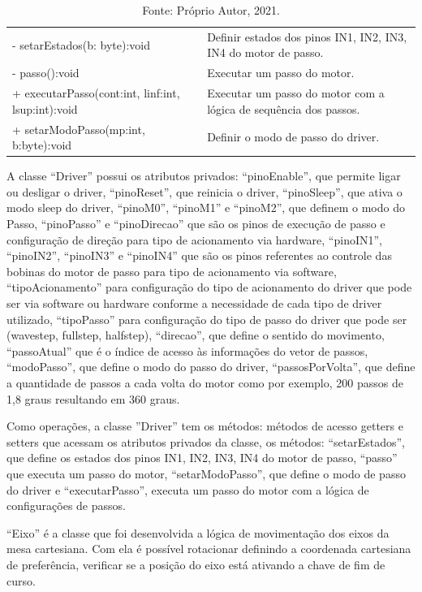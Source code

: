 \begin{table}[!htb]
\begin{tabular}{p{8cm}p{6cm}}
        - setarEstados(b: byte):void & Definir estados dos pinos IN1, IN2, IN3, IN4 do motor de passo.\\
        - passo():void & Executar um passo do motor.\\
        + executarPasso(cont:int, linf:int, lsup:int):void & Executar um passo do motor com a lógica de sequência dos passos.\\
        + setarModoPasso(mp:int, b:byte):void & Definir o modo de passo do driver.\\
        \hline       
    \end{tabular}
    \caption*{Fonte: Próprio Autor, 2021.}
    \label{tab:classedriver}
\end{table}

A classe “Driver” possui os atributos privados: “pinoEnable”, que permite ligar ou desligar o driver, 
“pinoReset”, que reinicia o driver, “pinoSleep”, que ativa o modo sleep do driver, “pinoM0”, “pinoM1” 
e “pinoM2”, que definem o modo do Passo, “pinoPasso” e “pinoDirecao” que são os pinos de execução de 
passo e configuração de direção para tipo de acionamento via hardware, “pinoIN1”, “pinoIN2”, “pinoIN3” 
e “pinoIN4” que são os pinos referentes ao controle das bobinas do motor de passo para tipo de acionamento 
via software, “tipoAcionamento” para configuração do tipo de acionamento do driver que pode ser via software 
ou hardware conforme a necessidade de cada tipo de driver utilizado, “tipoPasso” para configuração do tipo 
de passo do driver que pode ser (wavestep, fullstep, halfstep), “direcao”, que define o sentido do movimento, 
“passoAtual” que é o índice de acesso às informações do vetor de passos, “modoPasso”, que define o modo do 
passo do driver, “passosPorVolta”, que define a quantidade de passos a cada volta do motor como por exemplo, 
200 passos de 1,8 graus resultando em 360 graus. 

Como operações, a classe ”Driver” tem os métodos: métodos de acesso getters e setters que acessam os 
atributos privados da classe, os métodos: “setarEstados”, que define os estados dos pinos IN1, IN2, IN3, 
IN4 do motor de passo, “passo” que executa um passo do motor, “setarModoPasso”, que define o modo de passo 
do driver e “executarPasso”, executa um passo do motor com a lógica de configurações de passos.

“Eixo” é a classe que foi desenvolvida a lógica de movimentação dos eixos da mesa cartesiana. Com ela é 
possível rotacionar definindo a coordenada cartesiana de preferência, verificar se a posição do eixo 
está ativando a chave de fim de curso.

